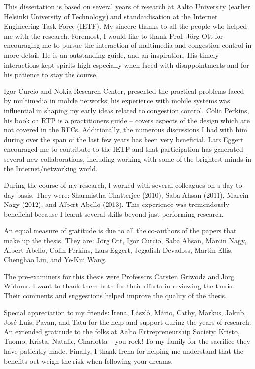 \documentclass[dissertation,final]{aaltoseries} %
\begin{document}

\begin{preface}[Espoo]

This dissertation is based on several years of research at Aalto University
(earlier Helsinki University of Technology) and standardisation at the
Internet Engineering Task Force (IETF). My sincere thanks to all the people who
helped me with the research. Foremost, I would like to thank Prof. J\"{o}rg Ott
for encouraging me to pursue the interaction of multimedia and congestion
control in more detail. He is an outstanding guide, and an inspiration. His
timely interactions kept spirits high especially when faced with
disappointments and for his patience to stay the course.

Igor Curcio and Nokia Research Center, presented the practical problems faced
by multimedia in mobile networks; his experience with mobile systems was
influential in shaping my early ideas related to congestion control.
%
Colin Perkins, his book on RTP is a practitioners guide -- covers aspects of the
design which are not covered in the RFCs. Additionally, the numerous
discussions I had with him during over the span of the last few years has been
very beneficial.
%
Lars Eggert encouraged me to contribute to the IETF and that participation
has generated several new collaborations, including working with some of the
brightest minds in the Internet/networking world.

During the course of my research, I worked with several colleagues on a
day-to-day basis. They were: Sharmistha Chatterjee (2010), Saba Ahsan (2011),
Marcin Nagy (2012), and Albert Abello (2013). This experience was tremendously
beneficial because I learnt several skills beyond just performing research.

An equal measure of gratitude is due to all the co-authors of  the papers that
make up the thesis. They are: J\"{o}rg Ott, Igor Curcio, Saba Ahsan, Marcin
Nagy, Albert Abello, Colin Perkins, Lars Eggert, Jegadish Devadoss,  Martin
Ellis, Chenghao Liu, and Ye-Kui Wang.

The pre-examiners for this thesis were Professors Carsten Griwodz and J\"{o}rg
Widmer. I want to thank them both for their efforts in reviewing the thesis.
Their comments and suggestions helped improve the quality of the thesis.

Special appreciation to my friends: Irena, L\'{a}szl\'{o}, M\'{a}rio, Cathy, 
Markus, Jakub, Jos\'{e}-Luis, Pavan, and Tatu for the help and support during
the years of research. An extended gratitude to the folks at Aalto
Entrepreneurship Society: Kristo, Tuomo, Krista, Natalie, Charlotta -- you rock! 
To my family for the sacrifice they have patiently made. Finally, I thank Irena 
for helping me understand that the benefits out-weigh the risk when following 
your dreams.

\end{preface}
\end{document}
